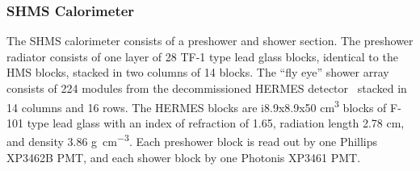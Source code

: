 \subsubsection{SHMS Calorimeter}
The SHMS calorimeter consists of a preshower and shower section.
The preshower radiator consists of one layer of 28 TF-1 type lead glass blocks,
identical to the HMS blocks, stacked in two columns of 14 blocks.
The ``fly eye'' shower array consists of 224 modules from the decommissioned
HERMES detector~\cite{Avakian_1998} stacked in 14 columns and 16 rows.
The HERMES blocks are i8.9x8.9x50 \si{\cm\cubed} blocks of F-101 type lead glass with
an index of refraction of 1.65, radiation length 2.78 \si{\cm}, and density
3.86 \si{\gram\per\cm\cubed}.
Each preshower block is read out by one Phillips XP3462B PMT, and each shower
block by one Photonis XP3461 PMT.
